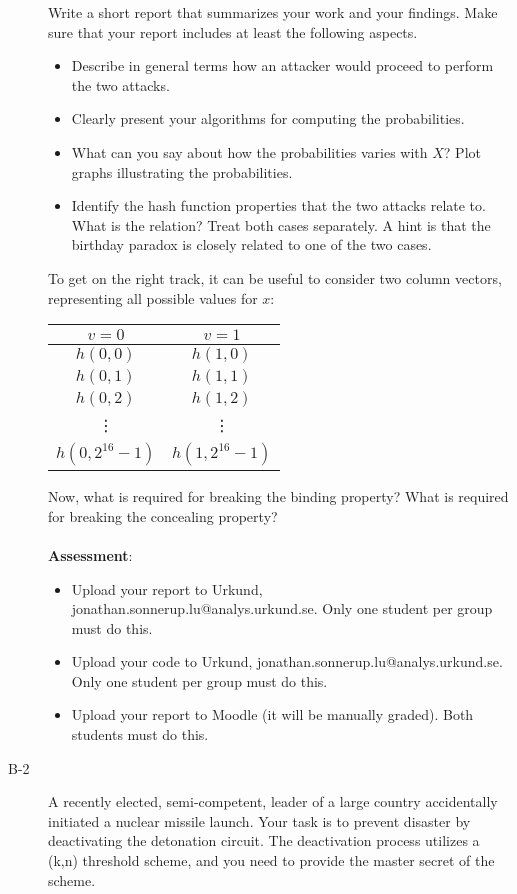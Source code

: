 \documentclass{article}
\begin{document}
\begin{description}
{		Write a short report that summarizes your work and your findings. Make sure that your report includes at least the following aspects.
		\begin{itemize}
			\item Describe in general terms how an attacker would proceed to perform the two attacks.
			\item Clearly present your algorithms for computing the probabilities.
			\item What can you say about how the probabilities varies with $X$? Plot graphs illustrating the probabilities. 
			\item Identify the hash function properties that the two attacks relate to. What is the relation? Treat both cases separately. A hint is that the birthday paradox is closely related to one of the two cases.
		\end{itemize}
		To get on the right track, it can be useful to consider two column vectors, representing all possible values for $x$:	
		\begin{center}
		\begin{tabular}{c|c}
			$v=0$ & $v=1$ \\\hline
			$h(0,0)$ & $h(1,0)$ \\
			$h(0,1)$ & $h(1,1)$ \\
			$h(0,2)$ & $h(1,2)$ \\
			\vdots & \vdots \\
			$h(0,2^{16}-1)$ & $h(1,2^{16}-1)$ \\
		\end{tabular}
		\end{center}
		Now, what is required for breaking the binding property? What is required for breaking the concealing property?\\\\
		
		\textbf{Assessment}:
		\begin{itemize}
			\item Upload your report to Urkund, jonathan.sonnerup.lu@analys.urkund.se. 
			Only one student per group must do this.
			\item Upload your code to Urkund, jonathan.sonnerup.lu@analys.urkund.se. Only one student per group must do this.
			\item Upload your report to Moodle (it will be manually graded). Both students must do this.
		\end{itemize}}
		
		
		\item[B-2]{A recently elected, semi-competent, leader of a large country accidentally initiated a nuclear missile launch. Your task is to prevent disaster by deactivating the detonation circuit. The deactivation process
			utilizes a (k,n) threshold scheme, and you need to provide the master secret of the scheme.
			
}
\end{description}
\end{document}
